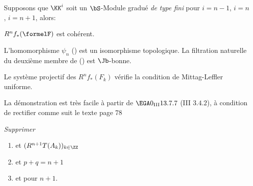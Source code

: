 \begin{theoreme} \label{IX.2.1}
Supposons que $\KK^i$ soit un $\bS$-Module gradu\'e \emph{de type fini} pour $i=n-1$, $i=n$, $i=n+1$, alors:
\begin{enumeratei}
\item
$R^nf_*(\formelF)$ est coh\'erent.
\item
L'homomorphisme $\psi_n$ () est un isomorphisme topologique. La filtration naturelle du deuxi\`eme membre de () est ${\Jb}$-bonne.
\item
Le syst\`eme projectif des $R^nf_*(F_k)$ v\'erifie la condition de Mittag-Leffler uniforme.
\end{enumeratei}
\end{theoreme}

La d\'emonstration est tr\`es facile \`a partir de $\EGA 0_{\textup{III}} 13.7.7$ (\cf \EGA III $3.4.2$)\pageoriginale, \`a condition de rectifier comme suit le texte page 78
\par
\emph{Supprimer}\begin{enumerate}
\item[ligne 6] \og et $(R^{n+1}T(A_k))_{k\in \ZZ}$\fg\
\item[ligne 13] \og et $p+q=n+1$\fg\
\item[ligne 23] \og et pour $n+1$\fg.
\end{enumerate}

